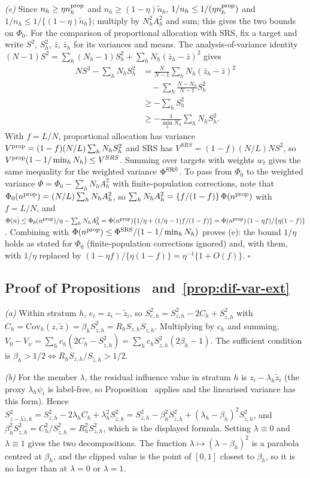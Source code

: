 \emph{(e)} Since $n_h\ge\eta n^{\rm prop}_h$ and $n_h\ge(1-\eta)\tilde n_h$,
$1/n_h\le1/(\eta n^{\rm prop}_h)$ and $1/n_h\le1/\{(1-\eta)\tilde n_h\}$; multiply by $N_h^2A_h^2$ and
sum; this gives the two bounds on $\Phi_0$. For the comparison of proportional allocation with SRS, fix a target and write $S^2$, $S^2_h$,
$\bar z$, $\bar z_h$ for its variances and means. The analysis-of-variance identity
$(N-1)S^2=\sum_h(N_h-1)S_h^2+\sum_hN_h(\bar z_h-\bar z)^2$ gives
\begin{align*}
NS^2-\sum_hN_hS^2_h&=\frac{N}{N-1}\sum_hN_h(\bar z_h-\bar z)^2\\
&\quad-\sum_h\frac{N-N_h}{N-1}S_h^2\\
&\ge-\sum_hS^2_h\\
&\ge-\frac{1}{\min_hN_h}\sum_hN_hS^2_h .
\end{align*}
With $f=L/N$, proportional allocation has variance $V^{\rm prop}=(1-f)(N/L)\sum_hN_hS^2_h$ and SRS has
$V^{SRS}=(1-f)(N/L)NS^2$, so $V^{\rm prop}(1-1/\min_hN_h)\le V^{SRS}$. Summing over targets with weights
$w_t$ gives the same inequality for the weighted variance $\Phi^{\rm SRS}$. To pass from $\Phi_0$ to the weighted variance $\Phi=\Phi_0-\sum_hN_hA_h^2$ with finite-population corrections, note that
$\Phi_0(n^{\rm prop})=(N/L)\sum_hN_hA_h^2$, so $\sum_hN_hA_h^2=\{f/(1-f)\}\,\Phi(n^{\rm prop})$ with $f=L/N$, and
$\Phi(n)\le\Phi_0(n^{\rm prop})/\eta-\sum_hN_hA_h^2=\Phi(n^{\rm prop})\{1/\eta+(1/\eta-1)f/(1-f)\}=\Phi(n^{\rm prop})\,(1-\eta f)/\{\eta(1-f)\}$.
Combining with $\Phi(n^{\rm prop})\le\Phi^{\rm SRS}/(1-1/\min_hN_h)$ proves (e): the bound $1/\eta$ holds as stated for $\Phi_0$ (finite-population corrections ignored) and, with them, with
$1/\eta$ replaced by $(1-\eta f)/\{\eta(1-f)\}=\eta^{-1}\{1+O(f)\}$. $\square$

\subsection{Proof of Propositions~ and~\ref{prop:dif-var-ext}}

\emph{(a)} Within stratum $h$, $e_i=z_i-\tilde z_i$, so $S^2_{e,h}=S^2_{z,h}-2C_h+S^2_{\tilde z,h}$ with $C_h=\mathrm{Cov}_h(z,\tilde z)=\beta_hS^2_{\tilde z,h}=R_hS_{z,h}S_{\tilde z,h}$.
Multiplying by $c_h$ and summing, $V_0-V_\psi=\sum_hc_h(2C_h-S^2_{\tilde z,h})=\sum_hc_hS^2_{\tilde z,h}(2\beta_h-1)$. The sufficient condition is $\beta_h>1/2\iff R_hS_{z,h}/S_{\tilde z,h}>1/2$.

\emph{(b)} For the member $\lambda$, the residual influence value in stratum $h$ is $z_i-\lambda_h\tilde z_i$ (the proxy $\lambda_h\psi_i$ is label-free, so Proposition~ applies and the linearised
variance has this form). Hence $S^2_{z-\lambda\tilde z,h}=S^2_{z,h}-2\lambda_hC_h+\lambda_h^2S^2_{\tilde z,h}=S^2_{z,h}-\beta_h^2S^2_{\tilde z,h}+(\lambda_h-\beta_h)^2S^2_{\tilde z,h}$, and
$\beta_h^2S^2_{\tilde z,h}=C_h^2/S^2_{\tilde z,h}=R_h^2S^2_{z,h}$, which is the displayed formula. Setting $\lambda\equiv0$ and $\lambda\equiv1$ gives the two decompositions. The function $\lambda\mapsto(\lambda-\beta_h)^2$
is a parabola centred at $\beta_h$, and the clipped value is the point of $[0,1]$ closest to $\beta_h$, so it is no larger than at $\lambda=0$ or $\lambda=1$.

